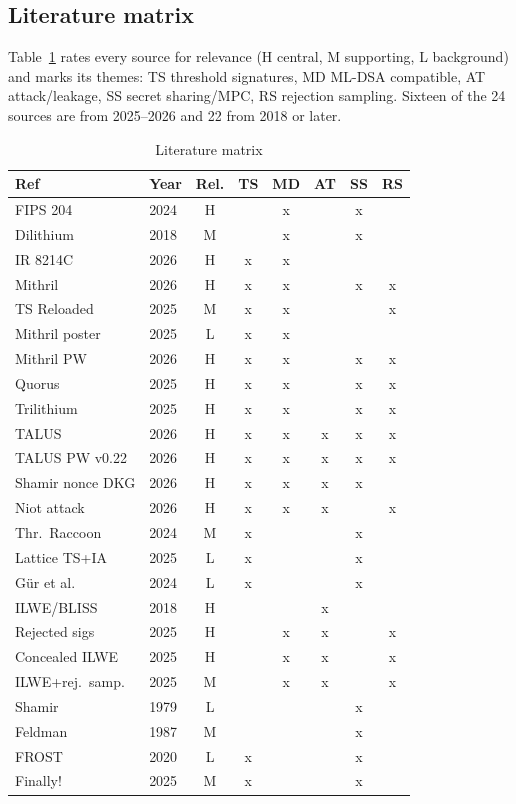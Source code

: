 \documentclass[10pt,conference,a4paper]{IEEEtran}
\begin{document}
\subsection{Literature matrix}
Table~\ref{tab:matrix} rates every source for relevance (H central, M supporting, L background) and marks its themes:
TS threshold signatures, MD ML-DSA compatible, AT attack/leakage, SS secret sharing/MPC, RS rejection sampling. Sixteen
of the 24 sources are from 2025--2026 and 22 from 2018 or later.

\begin{table}[t]
\caption{Literature matrix}\label{tab:matrix}
\centering\scriptsize
\begin{tabular}{@{}llcccccc@{}}
\toprule
Ref & Year & Rel. & TS & MD & AT & SS & RS\\
\midrule
\cite{fips204} FIPS 204 & 2024 & H &  & x &  & x & \\
\cite{dilithium} Dilithium & 2018 & M &  & x &  & x & \\
\cite{ir8214c} IR 8214C & 2026 & H & x & x &  &  & \\
\cite{mithril} Mithril & 2026 & H & x & x &  & x & x\\
\cite{reloaded} TS Reloaded & 2025 & M & x & x &  &  & x\\
\cite{mithrilposter} Mithril poster & 2025 & L & x & x &  &  & \\
\cite{mithrilpw} Mithril PW & 2026 & H & x & x &  & x & x\\
\cite{quorus} Quorus & 2025 & H & x & x &  & x & x\\
\cite{trilithium} Trilithium & 2025 & H & x & x &  & x & x\\
\cite{talus} TALUS & 2026 & H & x & x & x & x & x\\
\cite{taluspw} TALUS PW v0.22 & 2026 & H & x & x & x & x & x\\
\cite{kao} Shamir nonce DKG & 2026 & H & x & x & x & x & \\
\cite{niot} Niot attack & 2026 & H & x & x & x &  & x\\
\cite{raccoon} Thr.\ Raccoon & 2024 & M & x &  &  & x & \\
\cite{dpia} Lattice TS+IA & 2025 & L & x &  &  & x & \\
\cite{gks} G\"ur et al. & 2024 & L & x &  &  & x & \\
\cite{ilwe} ILWE/BLISS & 2018 & H &  &  & x &  & \\
\cite{rejected} Rejected sigs & 2025 & H &  & x & x &  & x\\
\cite{concealed} Concealed ILWE & 2025 & H &  & x & x &  & x\\
\cite{yates} ILWE+rej.\ samp. & 2025 & M &  & x & x &  & x\\
\cite{shamir} Shamir & 1979 & L &  &  &  & x & \\
\cite{feldman} Feldman & 1987 & M &  &  &  & x & \\
\cite{frost} FROST & 2020 & L & x &  &  & x & \\
\cite{finally} Finally! & 2025 & M & x &  &  & x & \\
\bottomrule
\end{tabular}
\end{table}
\end{document}
